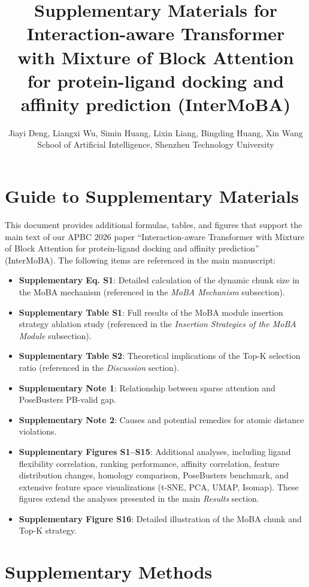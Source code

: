 ﻿\documentclass[11pt,a4paper]{article}
\title{Supplementary Materials for\\ Interaction-aware Transformer with Mixture of Block Attention\\ for protein-ligand docking and affinity prediction (InterMoBA)}
\author{Jiayi Deng, Liangxi Wu, Simin Huang, Lixin Liang, Bingding Huang, Xin Wang\\ \small{School of Artificial Intelligence, Shenzhen Technology University}}
\date{}
\begin{document}
\maketitle
\tableofcontents

\section*{Guide to Supplementary Materials}
This document provides additional formulas, tables, and figures that support the main text of our APBC 2026 paper “Interaction-aware Transformer with Mixture of Block Attention for protein-ligand docking and affinity prediction” (InterMoBA). The following items are referenced in the main manuscript:

\begin{itemize}
    \item \textbf{Supplementary Eq. S1}: Detailed calculation of the dynamic chunk size in the MoBA mechanism (referenced in the \textit{MoBA Mechanism} subsection).
    \item \textbf{Supplementary Table S1}: Full results of the MoBA module insertion strategy ablation study (referenced in the \textit{Insertion Strategies of the MoBA Module} subsection).
    \item \textbf{Supplementary Table S2}: Theoretical implications of the Top-K selection ratio (referenced in the \textit{Discussion} section).
    \item \textbf{Supplementary Note 1}: Relationship between sparse attention and PoseBusters PB-valid gap.
    \item \textbf{Supplementary Note 2}: Causes and potential remedies for atomic distance violations.
    \item \textbf{Supplementary Figures S1–S15}: Additional analyses, including ligand flexibility correlation, ranking performance, affinity correlation, feature distribution changes, homology comparison, PoseBusters benchmark, and extensive feature space visualizations (t-SNE, PCA, UMAP, Isomap). These figures extend the analyses presented in the main \textit{Results} section.
    \item \textbf{Supplementary Figure S16}: Detailed illustration of the MoBA chunk and Top-K strategy.
\end{itemize}


\section{Supplementary Methods}
\end{document}

